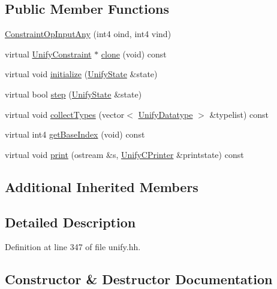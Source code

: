 \subsection*{Public Member Functions}
\begin{DoxyCompactItemize}
\item 
\mbox{\hyperlink{class_constraint_op_input_any_a501bfa403a33e528bb8947d9ac154f18}{Constraint\+Op\+Input\+Any}} (int4 oind, int4 vind)
\item 
virtual \mbox{\hyperlink{class_unify_constraint}{Unify\+Constraint}} $\ast$ \mbox{\hyperlink{class_constraint_op_input_any_acb465f5609db781a6d04aa6305964a7a}{clone}} (void) const
\item 
virtual void \mbox{\hyperlink{class_constraint_op_input_any_a819bcdb6da490558ba92e918090ea3e8}{initialize}} (\mbox{\hyperlink{class_unify_state}{Unify\+State}} \&state)
\item 
virtual bool \mbox{\hyperlink{class_constraint_op_input_any_a319f53489a8bea35df0359d26dc5f547}{step}} (\mbox{\hyperlink{class_unify_state}{Unify\+State}} \&state)
\item 
virtual void \mbox{\hyperlink{class_constraint_op_input_any_a80046f2931dd2b9bfdc0e3e04a57c00c}{collect\+Types}} (vector$<$ \mbox{\hyperlink{class_unify_datatype}{Unify\+Datatype}} $>$ \&typelist) const
\item 
virtual int4 \mbox{\hyperlink{class_constraint_op_input_any_a41c3e27075116062a4fde2c3da29013e}{get\+Base\+Index}} (void) const
\item 
virtual void \mbox{\hyperlink{class_constraint_op_input_any_ac2bd9bf9659cc33f50c42c56e6f2eb6e}{print}} (ostream \&s, \mbox{\hyperlink{class_unify_c_printer}{Unify\+C\+Printer}} \&printstate) const
\end{DoxyCompactItemize}
\subsection*{Additional Inherited Members}


\subsection{Detailed Description}


Definition at line 347 of file unify.\+hh.



\subsection{Constructor \& Destructor Documentation}
\mbox{\label{class_constraint_op_input_any_a501bfa403a33e528bb8947d9ac154f18}} 
